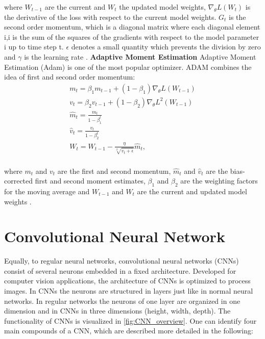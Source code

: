 where  $W_{t-1}$ are the current and $W_{t}$ the updated model weights, $\nabla_{\theta}L(W_{t})$ is the derivative of the loss with respect to the current model weights. $G_{t}$ is the second order momentum, which is a diagonal matrix where each diagonal element i,i is the sum of the squares of the gradients with respect to the model parameter i up to time step t. $\epsilon$ denotes a small quantity which prevents the division by zero and $\gamma$ is the learning rate \cite{Ruder2016}.
\newline
\newline
\textbf{Adaptive Moment Estimation}
\newline
Adaptive Moment Estimation (Adam) is one of the most popular optimizer. ADAM combines the idea of first and second order momentum: 
\begin{equation}
  \begin{aligned}
   &m_{t} =  \beta_{1} m_{t-1} +  (1-\beta_{1}) \nabla_{\theta}L(W_{t-1}) &\\
    &v_{t} =  \beta_{2} v_{t-1} +  (1-\beta_{2}) \nabla_{\theta}L^{2}(W_{t-1}) &\\
    &\hat{m}_{t} = \frac{m_{t}}{1-\beta_{1}^{t}}&\\
    &\hat{v}_{t} = \frac{v_{t}}{1-\beta_{2}^{t}}&\\
   & W_{t} = W_{t-1} - \frac{\eta}{\sqrt[2]{\hat{v}_{t} + \epsilon}}\hat{m}_{t}, &\\
  \end{aligned}
  \label{eq:ADAM}
\end{equation}

where $m_{t}$ and $v_{t}$ are the first and second momentum, $\hat{m}_{t}$ and $\hat{v}_{t}$ are the bias-corrected first and second moment estimates, $\beta_{1}$ and $\beta_{2}$ are the weighting factors for the moving average and $W_{t-1}$ and  $W_{t}$ are the current and updated model weights \cite{Ruder2016}.

\section{Convolutional Neural Network}

Equally, to regular neural networks, convolutional neural networks (CNNs) consist of several neurons embedded in a fixed architecture. Developed for computer vision applications, the architecture of CNNs is optimized to process images. In CNNs the neurons are structured in layers just like in normal neural networks. In regular networks the neurons of one layer are organized in one dimension and in CNNs in three dimensions (height, width, depth). The functionality of CNNs is visualized in \ref{fig:CNN_overview}. One can identify four main compounds of a CNN, which are described more detailed in the following:

